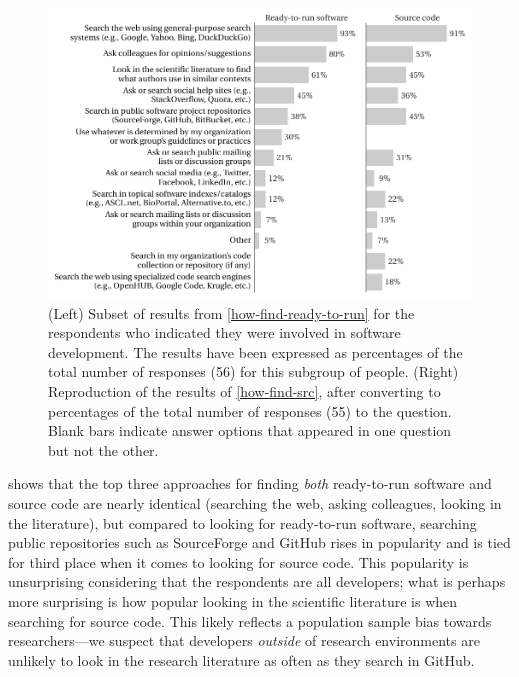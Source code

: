 \documentclass{casicswhitepaper}
\begin{document}
\begin{figure}[t]
  \vspace*{-1ex}
  \centering
  \includegraphics{files/plots/compare-how-find.pdf}
  \vspace*{-4ex}
  \caption{(Left) Subset of results from \ref{how-find-ready-to-run} for the respondents who indicated they were involved in software development.  The results have been expressed as percentages of the total number of responses (56) for this subgroup of people.  (Right) Reproduction of the results of \ref{how-find-src}, after converting to percentages of the total number of responses (55) to the question.  Blank bars indicate answer options that appeared in one question but not the other.}
  \label{compare-how-find}
\end{figure}

 shows that the top three approaches for finding \emph{both} ready-to-run software and source code are nearly identical (searching the web, asking colleagues, looking in the literature), but compared to looking for ready-to-run software, searching public repositories such as SourceForge and GitHub rises in popularity and is tied for third place when it comes to looking for source code.  This popularity is unsurprising considering that the respondents are all developers; what is perhaps more surprising is how popular looking in the scientific literature is when searching for source code.  This likely reflects a population sample bias towards researchers---we suspect that developers \emph{outside} of research environments are unlikely to look in the research literature as often as they search in GitHub.
\end{document}
